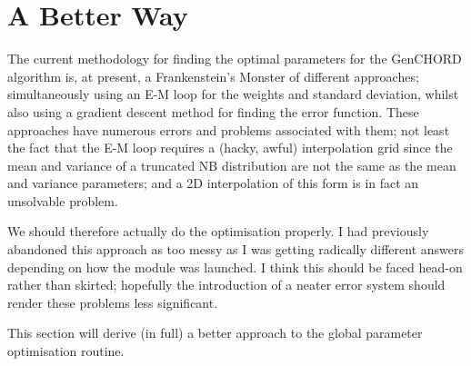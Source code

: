 \documentclass[fleqn,usenatbib]{acmart}
\begin{document}
	\newpage
	\section{A Better Way}

		The current methodology for finding the optimal parameters for the GenCHORD algorithm is, at present, a Frankenstein's Monster of different approaches; simultaneously using an E-M loop for the weights and standard deviation, whilst also using a gradient descent method for finding the error function. These approaches have numerous errors and problems associated with them; not least the fact that the E-M loop requires a (hacky, awful) interpolation grid since the mean and variance of a truncated NB distribution are not the same as the mean and variance parameters; and a 2D interpolation of this form is in fact an unsolvable problem. 

		We should therefore actually do the optimisation properly. I had previously abandoned this approach as too messy as I was getting radically different answers depending on how the module was launched. I think this should be faced head-on rather than skirted; hopefully the introduction of a neater error system should render these problems less significant. 

		This section will derive (in full) a better approach to the global parameter optimisation routine. 
\end{document}
